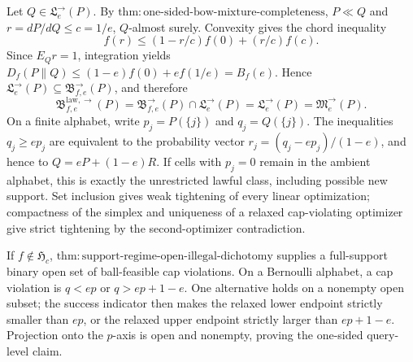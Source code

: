 Let \(Q\in\mathfrak L^{\to}_e(P)\).  By \(\mathrm{thm:one\text{-}sided\text{-}bow\text{-}mixture\text{-}completeness}\), \(P\ll Q\) and \(r=dP/dQ\le c=1/e\), \(Q\)-almost surely.  Convexity gives the chord inequality
\[
 f(r)\le(1-r/c)f(0)+(r/c)f(c).
\]
Since \(E_Qr=1\), integration yields \(D_f(P\|Q)\le(1-e)f(0)+ef(1/e)=B_f(e)\).  Hence \(\mathfrak L^{\to}_e(P)\subseteq\mathfrak B^{\to}_{f,e}(P)\), and therefore
\[
 \mathfrak B^{\mathrm{law},\to}_{f,e}(P)
 =\mathfrak B^{\to}_{f,e}(P)\cap\mathfrak L^{\to}_e(P)
 =\mathfrak L^{\to}_e(P)=\mathfrak M^{\to}_e(P).
\]
On a finite alphabet, write \(p_j=P(\{j\})\) and \(q_j=Q(\{j\})\).  The inequalities \(q_j\ge ep_j\) are equivalent to the probability vector \(r_j=(q_j-ep_j)/(1-e)\), and hence to \(Q=eP+(1-e)R\).  If cells with \(p_j=0\) remain in the ambient alphabet, this is exactly the unrestricted lawful class, including possible new support.  Set inclusion gives weak tightening of every linear optimization; compactness of the simplex and uniqueness of a relaxed cap-violating optimizer give strict tightening by the second-optimizer contradiction.

If \(f\notin\mathfrak H_c\), \(\mathrm{thm:support\text{-}regime\text{-}open\text{-}illegal\text{-}dichotomy}\) supplies a full-support binary open set of ball-feasible cap violations.  On a Bernoulli alphabet, a cap violation is \(q<ep\) or \(q>ep+1-e\).  One alternative holds on a nonempty open subset; the success indicator then makes the relaxed lower endpoint strictly smaller than \(ep\), or the relaxed upper endpoint strictly larger than \(ep+1-e\).  Projection onto the \(p\)-axis is open and nonempty, proving the one-sided query-level claim.